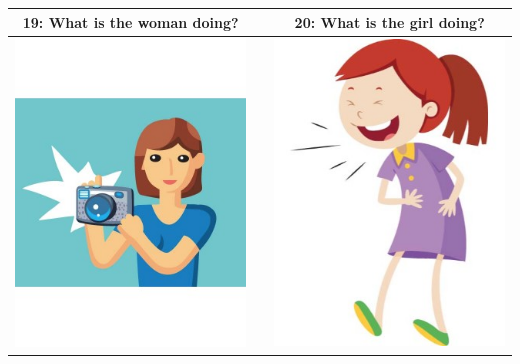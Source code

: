 \documentclass[12pt,notitlepage]{article}
\begin{document}
\begin{center}
\begin{tabular}{|c|c|c|}
\hline
19: What is the woman doing? && 20: What is the girl doing? \\
\hline
\includegraphics[width=20em,trim=0 0 0 -3]{figures/I19.jpg} & & \includegraphics[width=20em,trim=0 0 0 -3]{figures/I20.jpg} \\
\hline
\end{tabular}
\vspace{1em} \\



\end{center}
\end{document}
